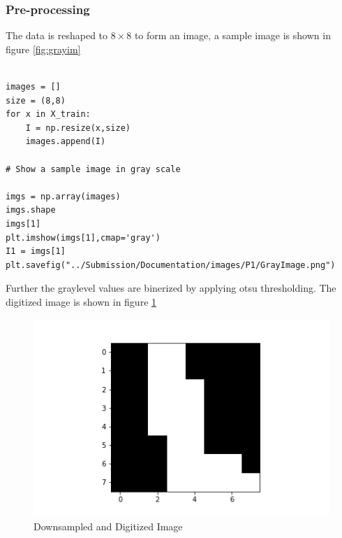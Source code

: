 \documentclass[10pt,a4paper]{article}
\begin{document}
\subsubsection{Pre-processing}
The data is reshaped to $8\times8$ to form an image, a sample image is shown in figure \ref{fig:grayim}

\lstset{%
basicstyle=\small, %
identifierstyle=, %
stringstyle=\ttfamily, %
showstringspaces=false} %

\lstset{language=Python}          %

\begin{lstlisting}[label=Image Resize,caption=Array to Image]  % Start your code-block

images = []
size = (8,8)
for x in X_train:
    I = np.resize(x,size)
    images.append(I)
    
# Show a sample image in gray scale

imgs = np.array(images)
imgs.shape
imgs[1]
plt.imshow(imgs[1],cmap='gray')
I1 = imgs[1]
plt.savefig("../Submission/Documentation/images/P1/GrayImage.png")    
\end{lstlisting}

Further the graylevel values are binerized by applying otsu thresholding. The digitized image is shown in figure \ref{fig:binaryim}
    
\graphicspath{ {/images/} }
\begin{figure}[!t]
\includegraphics[scale=0.75]{images/P1/Digitized_Sample_Image.png}
  \caption{Downsampled and Digitized Image}
  \label{fig:binaryim}
\end{figure}
\end{document}
